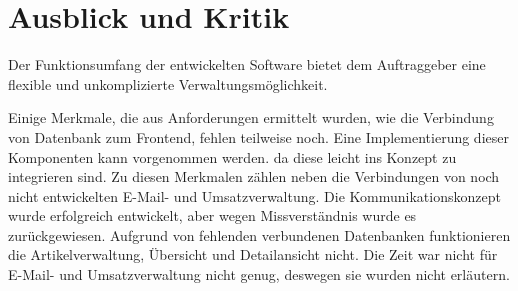 \section{Ausblick und Kritik}

Der Funktionsumfang der entwickelten Software bietet dem Auftraggeber eine flexible und unkomplizierte Verwaltungsmöglichkeit. 

Einige Merkmale, die aus Anforderungen ermittelt wurden, wie die Verbindung von Datenbank zum Frontend, fehlen teilweise noch. Eine Implementierung dieser Komponenten kann vorgenommen werden. da diese leicht ins Konzept zu integrieren sind. Zu diesen Merkmalen zählen neben die Verbindungen von noch nicht entwickelten E-Mail- und Umsatzverwaltung. 
Die Kommunikationskonzept wurde erfolgreich entwickelt, aber wegen Missverständnis wurde es zurückgewiesen.
Aufgrund von fehlenden verbundenen Datenbanken funktionieren die Artikelverwaltung, Übersicht und Detailansicht nicht.
Die Zeit war nicht für E-Mail- und Umsatzverwaltung nicht genug, deswegen sie wurden nicht erläutern. 
